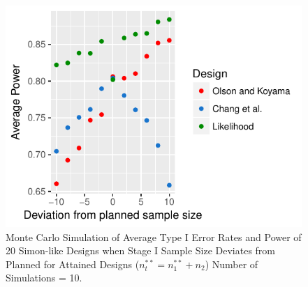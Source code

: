 \documentclass[12pt]{report}\usepackage[]{graphicx}\usepackage[]{color}
\newlength{\li}\setlength{\li}{14.48pt}
\begin{document}
\begin{landscape}
\begin{figure}[]
\caption{Monte Carlo Simulation of Average Type I Error Rates and Power of 20 Simon-like Designs when Stage I Sample Size Deviates from Planned for Attained Designs ($n_t^{\ast\ast} = n_1^{\ast\ast} + n_2$) Number of Simulations = 10.}
\centering
\begin{Schunk}


\centerline{\includegraphics{unnamed-chunk-5-1} }

\end{Schunk}
\end{figure}
\end{landscape}
\end{document}
